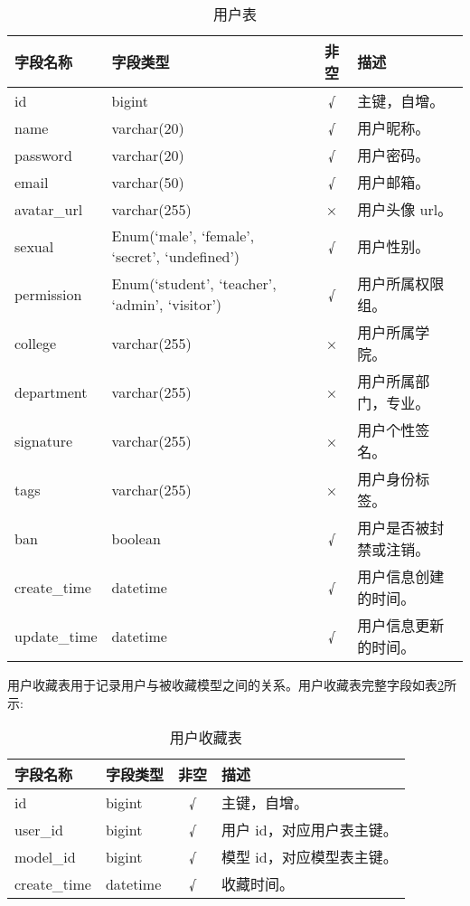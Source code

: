\begin{table}[H]
  \centering
  \small
  \caption{用户表}
  \label{table:用户表}
  \setlength{\tabcolsep}{4.2mm}
  \begin{tabular}{l|l|c|l}
    \toprule
    \textbf{字段名称} & \textbf{字段类型} & \textbf{非空} & \textbf{描述} \\
    \midrule
    id & bigint & √ & 主键，自增。 \\
    name & varchar(20) & √ & 用户昵称。 \\
    password & varchar(20) & √ & 用户密码。 \\
    email & varchar(50) & √ & 用户邮箱。 \\
    avatar\_url & varchar(255) & × & 用户头像 url。 \\
    sexual & Enum(`male', `female', `secret', `undefined') & √ & 用户性别。 \\
    permission & Enum(`student', `teacher', `admin', `visitor') & √ & 用户所属权限组。 \\ 
    college & varchar(255) & × & 用户所属学院。 \\
    department & varchar(255) & × & 用户所属部门，专业。 \\
    signature & varchar(255) & × & 用户个性签名。 \\
    tags & varchar(255) & × & 用户身份标签。 \\
    ban & boolean & √ & 用户是否被封禁或注销。 \\
    create\_time & datetime & √ & 用户信息创建的时间。 \\
    update\_time & datetime & √ & 用户信息更新的时间。 \\
    \bottomrule
  \end{tabular}
\end{table}

用户收藏表用于记录用户与被收藏模型之间的关系。用户收藏表完整字段如表\ref{table:用户收藏表}所示:

\begin{table}[H]
  \centering
  \small
  \caption{用户收藏表}
  \label{table:用户收藏表}
  \setlength{\tabcolsep}{9mm}
  \begin{tabular}{l|l|c|l}
    \toprule
    \textbf{字段名称} & \textbf{字段类型} & \textbf{非空} & \textbf{描述} \\
    \midrule
    id & bigint & √ & 主键，自增。 \\
    user\_id & bigint & √ & 用户 id，对应用户表主键。 \\
    model\_id & bigint & √ & 模型 id，对应模型表主键。 \\
    create\_time & datetime & √ & 收藏时间。 \\
    \bottomrule
  \end{tabular}
\end{table}

